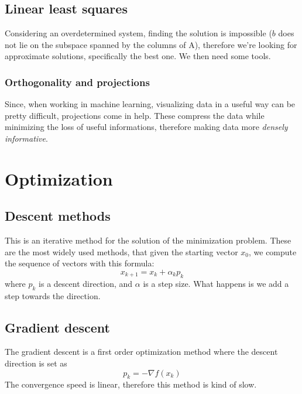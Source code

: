 \documentclass[11pt]{article}
\begin{document}
\subsection{Linear least squares}
Considering an overdetermined system, finding the solution is impossible ($b$ does not lie on the subspace spanned by the columns of A), therefore we're looking for approximate solutions, specifically the best one. We then need some tools.

\subsubsection{Orthogonality and projections}
Since, when working in machine learning, visualizing data in a useful way can be pretty difficult, projections come in help. These compress the data while minimizing the loss of useful informations, therefore making data more \textit{densely informative}. 
\section{Optimization}
\subsection{Descent methods}
This is an iterative method for the solution of the minimization problem. These are the most widely used methods, that given the starting vector $x_0$, we compute the sequence of vectors with this formula:
\begin{displaymath}
    x_{k+1}=x_k+\alpha_kp_k
\end{displaymath}
where $p_k$ is a descent direction, and $\alpha$ is a step size. What happens is we add a step towards the direction.
\subsection{Gradient descent} 
The gradient descent is a first order optimization method where the descent direction is set as
\begin{displaymath}
    p_k = -\nabla f(x_k) 
\end{displaymath}
The convergence speed is linear, therefore this method is kind of slow. 
\end{document}
